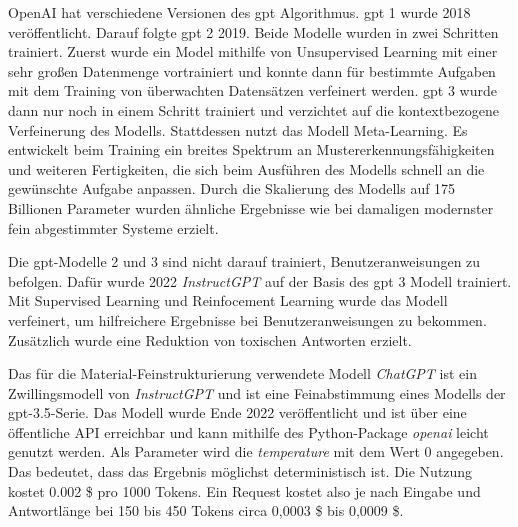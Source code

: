 OpenAI hat verschiedene Versionen des \ac{gpt} Algorithmus. \ac{gpt} 1 wurde 2018 veröffentlicht. Darauf folgte \ac{gpt} 2 2019. Beide Modelle wurden in zwei Schritten trainiert. Zuerst wurde ein Model mithilfe von Unsupervised Learning mit einer sehr großen Datenmenge vortrainiert und konnte dann für bestimmte Aufgaben mit dem Training von überwachten Datensätzen verfeinert werden. \citep[vgl.][]{alec_2018} \ac{gpt} 3 wurde dann nur noch in einem Schritt trainiert und verzichtet auf die kontextbezogene Verfeinerung des Modells. \citep[vgl.][]{zhu_luo_2022} Stattdessen nutzt das Modell \glqq Meta-Learning\grqq{}. Es entwickelt beim Training ein breites Spektrum an Mustererkennungsfähigkeiten und weiteren Fertigkeiten, die sich beim Ausführen des Modells schnell an die gewünschte Aufgabe anpassen. Durch die Skalierung des Modells auf 175 Billionen Parameter wurden ähnliche Ergebnisse wie bei damaligen modernster fein abgestimmter Systeme erzielt. \citep[vgl.][]{brown2020language} 

Die \ac{gpt}-Modelle 2 und 3 sind nicht darauf trainiert, Benutzeranweisungen zu befolgen. Dafür wurde 2022 \textit{InstructGPT} auf der Basis des \ac{gpt} 3 Modell trainiert. Mit Supervised Learning und Reinfocement Learning wurde das Modell verfeinert, um hilfreichere Ergebnisse bei Benutzeranweisungen zu bekommen. Zusätzlich wurde eine Reduktion von toxischen Antworten erzielt. \citep[vgl.][]{ouyang2022training}

Das für die Material-Feinstrukturierung verwendete Modell \textit{ChatGPT} ist ein Zwillingsmodell von \textit{InstructGPT} und ist eine Feinabstimmung eines Modells der \ac{gpt}-3.5-Serie. \citep[vgl.][]{OpenAI2022-la}
Das Modell wurde Ende 2022 veröffentlicht und ist über eine öffentliche API erreichbar und kann mithilfe des Python-Package \textit{openai} leicht genutzt werden. Als Parameter wird die \textit{temperature} mit dem Wert 0 angegeben. Das bedeutet, dass das Ergebnis möglichst deterministisch ist. \citep[vgl.][]{openai_reference} Die Nutzung kostet 0.002 \$ pro 1000 Tokens. \citep[vgl.][]{Openai_pricing} Ein Request kostet also je nach Eingabe und Antwortlänge bei 150 bis 450 Tokens circa 0,0003 \$ bis 0,0009 \$.

